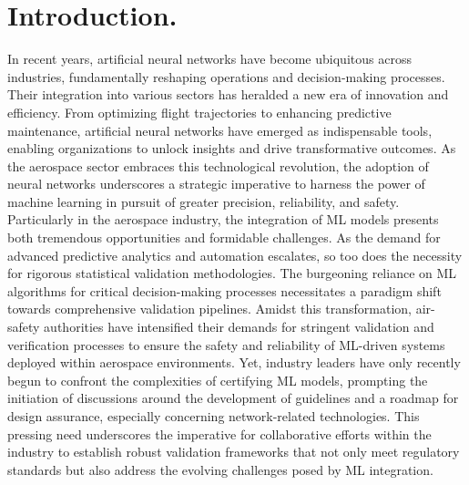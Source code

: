 \chapter{Introduction.}
%
\indent In recent years, artificial neural networks have become ubiquitous across industries, fundamentally reshaping operations and decision-making processes. Their integration into various sectors has heralded a new era of innovation and efficiency. From optimizing flight trajectories\cite{xu2023machine} to enhancing predictive maintenance\cite{shukla2020opportunities,adhikari2018machine,korvesis2017machine}, artificial neural networks have emerged as indispensable tools, enabling organizations to unlock insights and drive transformative outcomes. As the aerospace sector embraces this technological revolution, the adoption of neural networks underscores a strategic imperative to harness the power of machine learning in pursuit of greater precision, reliability, and safety. Particularly in the aerospace industry, the integration of ML models presents both tremendous opportunities and formidable challenges. As the demand for advanced predictive analytics and automation escalates, so too does the necessity for rigorous statistical validation methodologies. The burgeoning reliance on ML algorithms for critical decision-making processes necessitates a paradigm shift towards comprehensive validation pipelines. Amidst this transformation, air-safety authorities have intensified their demands for stringent validation and verification processes\cite{force2021concepts,roadmap2021easa} to ensure the safety and reliability of ML-driven systems deployed within aerospace environments. Yet, industry leaders have only recently begun to confront the complexities of certifying ML models\cite{henderson2022toward,durand2023formal,dmitriev2021toward,el2022certification,paul2023assurance}, prompting the initiation of discussions around the development of guidelines and a roadmap for design assurance, especially concerning network-related technologies. This pressing need underscores the imperative for collaborative efforts within the industry to establish robust validation frameworks that not only meet regulatory standards but also address the evolving challenges posed by ML integration.\\
%
\clearpage
%

